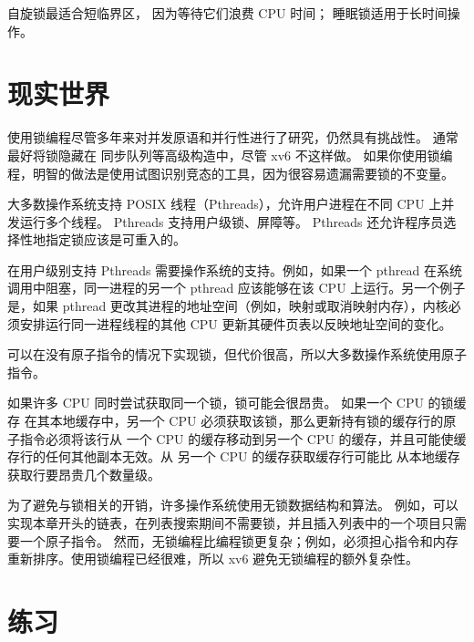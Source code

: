 自旋锁最适合短临界区，
因为等待它们浪费 CPU 时间；
睡眠锁适用于长时间操作。

\section{现实世界}
使用锁编程尽管多年来对并发原语和并行性进行了研究，仍然具有挑战性。
通常最好将锁隐藏在
同步队列等高级构造中，尽管 xv6 不这样做。
如果你使用锁编程，明智的做法是使用试图识别竞态的工具，因为很容易遗漏需要锁的不变量。

大多数操作系统支持 POSIX 线程（Pthreads），允许用户进程在不同 CPU 上并发运行多个线程。
Pthreads 支持用户级锁、屏障等。
Pthreads 还允许程序员选择性地指定锁应该是可重入的。

在用户级别支持 Pthreads 需要操作系统的支持。例如，如果一个 pthread 在系统调用中阻塞，同一进程的另一个 pthread 应该能够在该 CPU 上运行。另一个例子是，如果 pthread 更改其进程的地址空间（例如，映射或取消映射内存），内核必须安排运行同一进程线程的其他 CPU 更新其硬件页表以反映地址空间的变化。

可以在没有原子指令的情况下实现锁，但代价很高，所以大多数操作系统使用原子指令。

如果许多 CPU 同时尝试获取同一个锁，锁可能会很昂贵。
如果一个 CPU 的锁缓存
在其本地缓存中，另一个 CPU 必须获取该锁，那么更新持有锁的缓存行的原子指令必须将该行从
一个 CPU 的缓存移动到另一个 CPU 的缓存，并且可能使缓存行的任何其他副本无效。从
另一个 CPU 的缓存获取缓存行可能比
从本地缓存获取行要昂贵几个数量级。

为了避免与锁相关的开销，许多操作系统使用无锁数据结构和算法。
例如，可以实现本章开头的链表，在列表搜索期间不需要锁，并且插入列表中的一个项目只需要一个原子指令。
然而，无锁编程比编程锁更复杂；例如，必须担心指令和内存重新排序。使用锁编程已经很难，所以 xv6 避免无锁编程的额外复杂性。

\section{练习}

